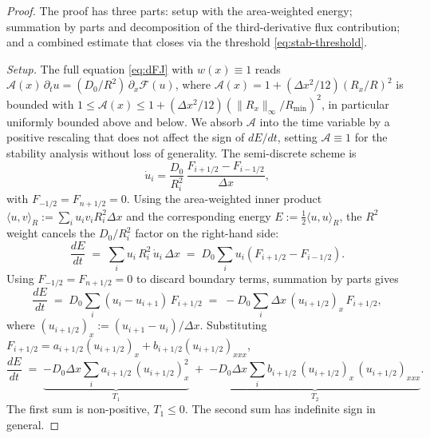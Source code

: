 \documentclass[11pt]{article}
\begin{document}
\begin{proof}
   The proof has three parts: setup with the area-weighted energy; summation by parts and decomposition of the third-derivative flux contribution; and a combined estimate that closes via the threshold \eqref{eq:stab-threshold}.

    \emph{Setup.}
    The full equation \eqref{eq:dFJ} with $w(x) \equiv 1$ reads $\mathcal{A}(x)\, \partial_t u = (D_0/R^2)\, \partial_x \mathcal{F}(u)$, where $\mathcal{A}(x) = 1 + (\Delta x^2/12)(R_x/R)^2$ is bounded with $1 \le \mathcal{A}(x) \le 1 + (\Delta x^2/12)(\|R_x\|_\infty/R_{\min})^2$, in particular uniformly bounded above and below. We absorb $\mathcal{A}$ into the time variable by a positive rescaling that does not affect the sign of $dE/dt$, setting $\mathcal{A} \equiv 1$ for the stability analysis without loss of generality. The semi-discrete scheme is
    \begin{equation}
        \dot{u}_i = \frac{D_0}{R_i^2}\, \frac{F_{i+1/2} - F_{i-1/2}}{\Delta x},
    \end{equation}
    with $F_{-1/2} = F_{n+1/2} = 0$. Using the area-weighted inner product $\langle u, v\rangle_R := \sum_i u_i v_i R_i^2 \Delta x$ and the corresponding energy $E := \tfrac{1}{2}\langle u, u\rangle_R$, the $R^2$ weight cancels the $D_0/R_i^2$ factor on the right-hand side:
    \begin{equation}
        \frac{dE}{dt} \;=\; \sum_i u_i\, R_i^2 \, \dot u_i\, \Delta x \;=\; D_0 \sum_i u_i (F_{i+1/2} - F_{i-1/2}).
    \end{equation}
    Using $F_{-1/2} = F_{n+1/2} = 0$ to discard boundary terms, summation by parts gives
    \begin{equation}
        \frac{dE}{dt} \;=\; D_0 \sum_i (u_i - u_{i+1})\, F_{i+1/2} \;=\; -D_0 \sum_i \Delta x\, (u_{i+1/2})_x\, F_{i+1/2},
    \end{equation}
    where $(u_{i+1/2})_x := (u_{i+1} - u_i)/\Delta x$. Substituting $F_{i+1/2} = a_{i+1/2}(u_{i+1/2})_x + b_{i+1/2}(u_{i+1/2})_{xxx}$,
    \begin{equation}
        \frac{dE}{dt} \;=\; \underbrace{-D_0 \Delta x \sum_i a_{i+1/2}\, (u_{i+1/2})_x^2}_{T_1} \;+\; \underbrace{-D_0 \Delta x \sum_i b_{i+1/2}\, (u_{i+1/2})_x\, (u_{i+1/2})_{xxx}}_{T_2}.
    \end{equation}
    The first sum is non-positive, $T_1 \leq 0$. The second sum has indefinite sign in general.


\end{proof}
\end{document}
